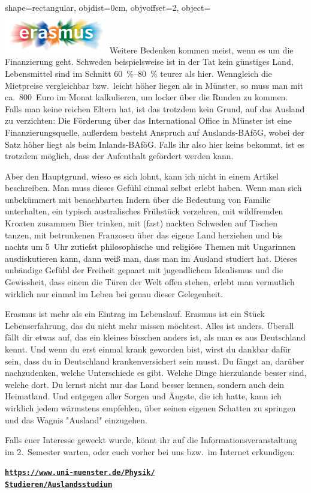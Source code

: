 \begin{pullquote}{shape=rectangular, objdist=0cm, objvoffset=2,
object={\includegraphics[width=4.5cm]{res/erasmus.jpg}}}
Weitere Bedenken kommen meist, wenn es um die Finanzierung geht.
Schweden beispielsweise ist in der Tat kein günstiges Land, Lebensmittel sind im Schnitt \SIrange{60}{80}{\percent} teurer als hier.
Wenngleich die Mietpreise vergleichbar bzw.\ leicht höher liegen als in Münster, so muss man mit ca.~800~Euro im Monat kalkulieren, um locker über die Runden zu kommen.
Falls man keine reichen Eltern hat, ist das trotzdem kein Grund, auf das Ausland zu verzichten: Die Förderung über das International Office in Münster ist eine Finanzierungsquelle, außerdem besteht Anspruch auf Auslands-BAföG, wobei der Satz höher liegt als beim Inlands-BAföG.
Falls ihr also hier keins bekommt, ist es trotzdem möglich, dass der Aufenthalt gefördert werden kann.\pullquotenl

Aber den Hauptgrund, wieso es sich lohnt, kann ich nicht in einem Artikel beschreiben.
Man muss dieses Gefühl einmal selbst erlebt haben.
Wenn man sich unbekümmert mit benachbarten Indern über die Bedeutung von Familie unterhalten, ein typisch australisches Frühstück verzehren, mit wildfremden Kroaten zusammen Bier trinken, mit (fast) nackten Schweden auf Tischen tanzen, mit betrunkenen Franzosen über das eigene Land herziehen und bis nachts um 5~Uhr zutiefst philosophische und religiöse Themen mit Ungarinnen ausdiskutieren kann, dann weiß man, dass man im Ausland studiert hat.
Dieses unbändige Gefühl der Freiheit gepaart mit jugendlichem Idealismus und die Gewissheit, dass einem die Türen der Welt offen stehen, erlebt man vermutlich wirklich nur einmal im Leben bei genau dieser Gelegenheit.\pullquotenl

Erasmus ist mehr als ein Eintrag im Lebenslauf.
Erasmus ist ein Stück Lebenserfahrung, das du nicht mehr missen möchtest.
Alles ist anders.
Überall fällt dir etwas auf, das ein kleines bisschen anders ist, als man es aus Deutschland kennt.
Und wenn du erst einmal krank geworden bist, wirst du dankbar dafür sein, dass du in Deutschland krankenversichert sein musst.
Du fängst an, darüber nachzudenken, welche Unterschiede es gibt.
Welche Dinge hierzulande besser sind, welche dort.
Du lernst nicht nur das Land besser kennen, sondern auch dein Heimatland.
Und entgegen aller Sorgen und Ängste, die ich hatte, kann ich wirklich jedem wärmstens empfehlen, über seinen eigenen Schatten zu springen und das Wagnis "Ausland" einzugehen.\pullquotenl

Falls euer Interesse geweckt wurde, könnt ihr auf die Informationsveranstaltung im 2.~Semester warten, oder euch vorher bei uns bzw.\ im Internet erkundigen:

\href{https://www.uni-muenster.de/Physik/Studieren/Auslandsstudium}{\textbf{\texttt{https://www.uni-muenster.de/Physik/\\Studieren/Auslandsstudium}}}

\end{pullquote}
